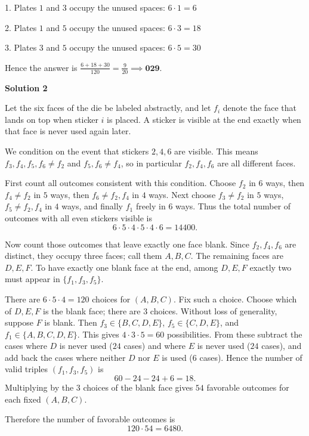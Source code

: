 \begin{enumerate}
 1. Plates $1$ and $3$ occupy the unused spaces: $6\cdot 1=6$

 2. Plates $1$ and $5$ occupy the unused spaces: $6\cdot 3=18$

 3. Plates $3$ and $5$ occupy the unused spaces: $6\cdot 5=30$

 Hence the answer is $\frac{6+18+30}{120}=\frac{9}{20}\implies \boxed{\textbf{029}}$.

 



\textbf{Solution 2}

Let the six faces of the die be labeled abstractly, and let $f_i$ denote the face that lands on top when sticker $i$ is placed. A sticker is visible at the end exactly when that face is never used again later.

 We condition on the event that stickers $2,4,6$ are visible. This means $f_3,f_4,f_5,f_6 \neq f_2$ and $f_5,f_6 \neq f_4$, so in particular $f_2,f_4,f_6$ are all different faces.

 First count all outcomes consistent with this condition. Choose $f_2$ in $6$ ways, then $f_4 \neq f_2$ in $5$ ways, then $f_6 \neq f_2,f_4$ in $4$ ways. Next choose $f_3 \neq f_2$ in $5$ ways, $f_5 \neq f_2,f_4$ in $4$ ways, and finally $f_1$ freely in $6$ ways. Thus the total number of outcomes with all even stickers visible is
 \[6\cdot5\cdot4\cdot5\cdot4\cdot6=14400.\]

 Now count those outcomes that leave exactly one face blank. Since $f_2,f_4,f_6$ are distinct, they occupy three faces; call them $A,B,C$. The remaining faces are $D,E,F$. To have exactly one blank face at the end, among $D,E,F$ exactly two must appear in $\{f_1,f_3,f_5\}$.

 There are $6\cdot5\cdot4=120$ choices for $(A,B,C)$. Fix such a choice. Choose which of $D,E,F$ is the blank face; there are $3$ choices. Without loss of generality, suppose $F$ is blank. Then $f_3\in\{B,C,D,E\}$, $f_5\in\{C,D,E\}$, and $f_1\in\{A,B,C,D,E\}$. This gives $4\cdot3\cdot5=60$ possibilities. From these subtract the cases where $D$ is never used ($24$ cases) and where $E$ is never used ($24$ cases), and add back the cases where neither $D$ nor $E$ is used ($6$ cases). Hence the number of valid triples $(f_1,f_3,f_5)$ is
 \[60-24-24+6=18.\]Multiplying by the $3$ choices of the blank face gives $54$ favorable outcomes for each fixed $(A,B,C)$.

 Therefore the number of favorable outcomes is
 \[120\cdot54=6480.\]


\end{enumerate}
